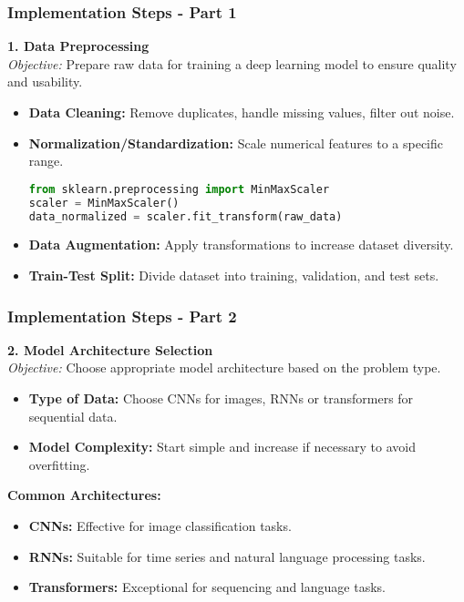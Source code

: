 \documentclass[aspectratio=169]{beamer}
\begin{document}
\begin{frame}[fragile]
    \frametitle{Implementation Steps - Part 1}
    \footnotesize
    \textbf{1. Data Preprocessing} \\
    \textit{Objective:} Prepare raw data for training a deep learning model to ensure quality and usability.
    \begin{itemize}
        \item \textbf{Data Cleaning:} Remove duplicates, handle missing values, filter out noise.
        \item \textbf{Normalization/Standardization:} Scale numerical features to a specific range.
        \begin{lstlisting}[language=Python]
from sklearn.preprocessing import MinMaxScaler
scaler = MinMaxScaler()
data_normalized = scaler.fit_transform(raw_data)
        \end{lstlisting}
        \item \textbf{Data Augmentation:} Apply transformations to increase dataset diversity.
        \item \textbf{Train-Test Split:} Divide dataset into training, validation, and test sets.
    \end{itemize}
\end{frame}

\begin{frame}[fragile]
    \frametitle{Implementation Steps - Part 2}
    \footnotesize
    \textbf{2. Model Architecture Selection} \\
    \textit{Objective:} Choose appropriate model architecture based on the problem type.
    \begin{itemize}
        \item \textbf{Type of Data:} Choose CNNs for images, RNNs or transformers for sequential data.
        \item \textbf{Model Complexity:} Start simple and increase if necessary to avoid overfitting.
    \end{itemize}
    \textbf{Common Architectures:}
    \begin{itemize}
        \item \textbf{CNNs:} Effective for image classification tasks.
        \item \textbf{RNNs:} Suitable for time series and natural language processing tasks.
        \item \textbf{Transformers:} Exceptional for sequencing and language tasks.
    \end{itemize}
\end{frame}
\end{document}
